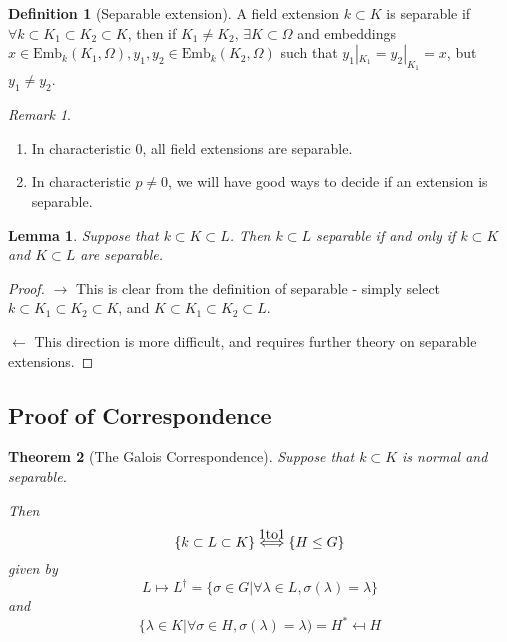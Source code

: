 \documentclass{article}
\theoremstyle{definition}
\newtheorem{defn}{Definition}[section]
\theoremstyle{plain}%
\newtheorem{thm}{Theorem}[section]
\newtheorem{lem}[thm]{Lemma}
\theoremstyle{remark}
\newtheorem*{rem}{Remark}
\newcommand{\Emb}{\text{Emb}}
\begin{document}
\begin{defn}[Separable extension]
    A field extension $k \subset K$ is separable if $\forall k \subset K_1 \subset K_2 \subset K$, then if $K_1 \ne K_2$, $\exists K \subset \Omega$ and embeddings $x \in \Emb_k(K_1, \Omega), y_1, y_2 \in \Emb_k(K_2, \Omega)$ such that $y_1|_{K_1} = y_2|_{K_1} = x$, but $y_1 \ne y_2$.
\end{defn}

\begin{rem}
    \begin{enumerate}
        \item In characteristic 0, all field extensions are separable.
        \item In characteristic $p \ne 0$, we will have good ways to decide if an extension is separable.
    \end{enumerate}
\end{rem}

\begin{lem}
    Suppose that $k \subset K \subset L$. Then $k \subset L$ separable if and only if $k \subset K$ and $K \subset L$ are separable.
\end{lem}

\begin{proof}
  $\rightarrow$ This is clear from the definition of separable - simply select $k \subset K_1 \subset K_2 \subset K$, and $K \subset K_1 \subset K_2 \subset L$.
  
  $\leftarrow$ This direction is more difficult, and requires further theory on separable extensions.
\end{proof}

\subsection{Proof of Correspondence}

\begin{thm}[The Galois Correspondence]
    Suppose that $k \subset K$ is normal and separable.
    
    Then
    \[\{ k \subset L \subset K \} \stackrel{\mathclap{\normalfont\mbox{1to1}}}{\Longleftrightarrow} \{ H \le G \}\]
    given by
    \[L \mapsto L^\dagger = \{ \sigma \in G | \forall \lambda \in L, \sigma(\lambda) = \lambda \}\]
    and
    \[\{ \lambda \in K | \forall \sigma \in H, \sigma(\lambda) = \lambda) = H^{*} \mapsfrom H\]
\end{thm}
\end{document}
